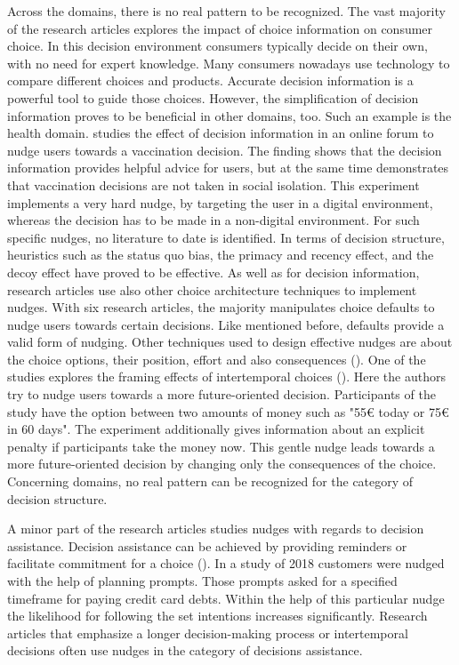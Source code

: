 Across the domains, there is no real pattern to be recognized. The vast majority of the research articles explores the impact of choice information on consumer choice. In this decision environment consumers typically decide on their own, with no need for expert knowledge. Many consumers nowadays use technology to compare different choices and products. Accurate decision information is a powerful tool to guide those choices. 
However, the simplification of decision information proves to be beneficial in other domains, too. Such an example is the health domain. \cite{langley_should_2015} studies the effect of decision information in an online forum to nudge users towards a vaccination decision. The finding shows that the decision information provides helpful advice for users, but at the same time demonstrates that vaccination decisions are not taken in social isolation. This experiment implements a very hard nudge, by targeting the user in a digital environment, whereas the decision has to be made in a non-digital environment. For such specific nudges, no literature to date is identified.
In terms of decision structure, heuristics such as the status quo bias, the primacy and recency effect, and the decoy effect have proved to be effective. As well as for decision information, research articles use also other choice architecture techniques to implement nudges. With six research articles, the majority manipulates choice defaults to nudge users towards certain decisions. Like mentioned before, defaults provide a valid form of nudging. Other techniques used to design effective nudges are about the choice options, their position, effort and also consequences (\cite{munscher_review_2016}). One of the studies explores the framing effects of intertemporal choices (\cite{faralla_framing_2017}). Here the authors try to nudge users towards a more future-oriented decision. Participants of the study have the option between two amounts of money such as "55€ today or 75€ in 60 days". The experiment additionally gives information about an explicit penalty if participants take the money now. This gentle nudge leads towards a more future-oriented decision by changing only the consequences of the choice. Concerning domains, no real pattern can be recognized for the category of decision structure.

A minor part of the research articles studies nudges with regards to decision assistance. Decision assistance can be achieved by providing reminders or facilitate commitment for a choice (\cite{munscher_review_2016}). In a study of 2018 customers were nudged with the help of planning prompts. Those prompts asked for a specified timeframe for paying credit card debts. Within the help of this particular nudge the likelihood for following the set intentions increases significantly.
Research articles that emphasize a longer decision-making process or intertemporal decisions often use nudges in the category of decisions assistance.


